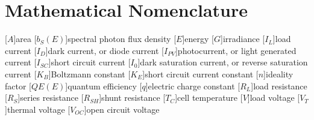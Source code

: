 \appendix
\chapter{Mathematical Nomenclature}

\begin{acronym}
    [$A$]{area}
    [$b_S(E)$]{spectral photon flux density}
    [$E$]{energy}
    [$G$]{irradiance}
    [$I_L$]{load current}
    [$I_D$]{dark current, or diode current}
    [$I_{PV}$]{photocurrent, or light generated current}
    [$I_{SC}$]{short circuit current}
    [$I_0$]{dark saturation current, or reverse saturation current}
    [$K_B$]{Boltzmann constant}
    [$K_E$]{short circuit current constant}
    [$n$]{ideality factor}
    [$QE(E)$]{quantum efficiency}
    [$q$]{electric charge constant}
    [$R_L$]{load resistance}
    [$R_S$]{series resistance}
    [$R_{SH}$]{shunt resistance}
    [$T_C$]{cell temperature}
    [$V$]{load voltage}
    [$V_T$]{thermal voltage}
    [$V_{OC}$]{open circuit voltage}
\end{acronym}